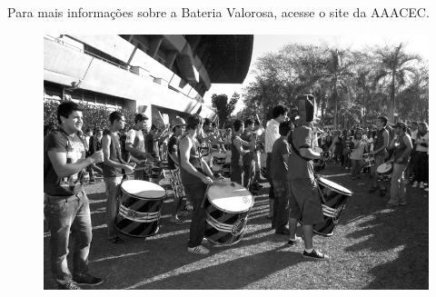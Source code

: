Para mais informações sobre a Bateria Valorosa, acesse o site da AAACEC.

\begin{figure}[H]
    \centering
    \includegraphics[scale=0.27]{img/valorosa_foto2.jpg}
\end{figure}
